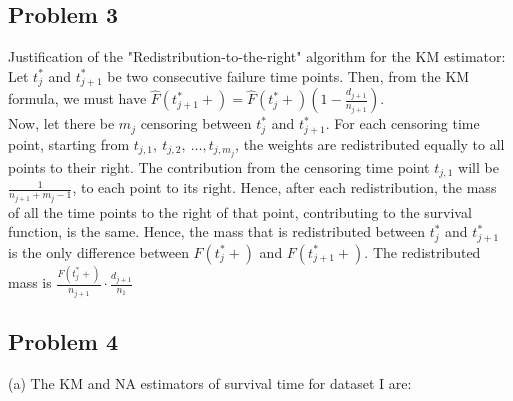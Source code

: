 \documentclass[11pt]{extarticle} %
\begin{document}
\subsection*{Problem 3}
\noindent
Justification of the "Redistribution-to-the-right" algorithm for the KM estimator:\\
Let $t_j^*$ and $t_{j+1}^*$ be two consecutive failure time points. Then, from the KM formula, we must have $\hat{F}(t^*_{j+1}+) = \hat{F}(t^*_{j}+)\left(1 - \frac{d_{j+1}}{n_{j+1}}\right)$. \\
Now, let there be $m_j$ censoring between $t^*_j$ and $t^*_{j+1}$. For each censoring time point, starting from $t_{j,1},\ t_{j,2},\ \dots, t_{j,m_j}$, the weights are redistributed equally to all points to their right. The contribution from the censoring time point $t_{j,1}$ will be $\frac{1}{n_{j+1} + m_j - 1}$, to each point to its right. Hence, after each redistribution, the mass of all the time points to the right of that point, contributing to the survival function, is the same. Hence, the mass that is redistributed between $t^*_j$ and $t^*_{j+1}$ is the only difference between $F(t^*_j +)$ and $F(t^*_{j+1} +)$. The redistributed mass is $\frac{F(t^*_{j} +)}{n_{j+1}}\cdot\frac{d_{j+1}}{n_1}$

\subsection*{Problem 4}
\noindent
(a) The KM and NA estimators of survival time for dataset I are:
\end{document}
